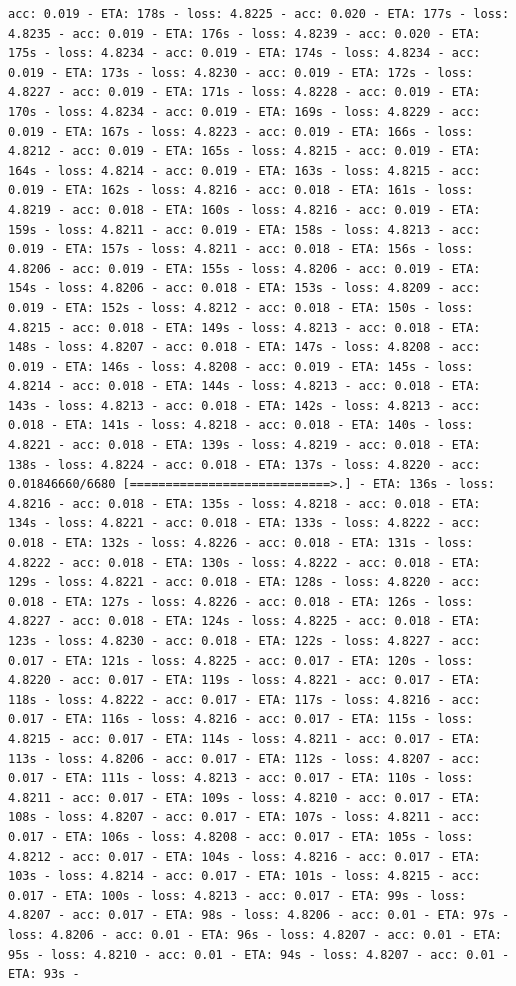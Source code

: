 \documentclass[11pt]{article}
\begin{document}
\begin{Verbatim}[commandchars=\\\{\}]
acc: 0.019 - ETA: 178s - loss: 4.8225 - acc: 0.020 - ETA: 177s - loss: 4.8235 - acc: 0.019 - ETA: 176s - loss: 4.8239 - acc: 0.020 - ETA: 175s - loss: 4.8234 - acc: 0.019 - ETA: 174s - loss: 4.8234 - acc: 0.019 - ETA: 173s - loss: 4.8230 - acc: 0.019 - ETA: 172s - loss: 4.8227 - acc: 0.019 - ETA: 171s - loss: 4.8228 - acc: 0.019 - ETA: 170s - loss: 4.8234 - acc: 0.019 - ETA: 169s - loss: 4.8229 - acc: 0.019 - ETA: 167s - loss: 4.8223 - acc: 0.019 - ETA: 166s - loss: 4.8212 - acc: 0.019 - ETA: 165s - loss: 4.8215 - acc: 0.019 - ETA: 164s - loss: 4.8214 - acc: 0.019 - ETA: 163s - loss: 4.8215 - acc: 0.019 - ETA: 162s - loss: 4.8216 - acc: 0.018 - ETA: 161s - loss: 4.8219 - acc: 0.018 - ETA: 160s - loss: 4.8216 - acc: 0.019 - ETA: 159s - loss: 4.8211 - acc: 0.019 - ETA: 158s - loss: 4.8213 - acc: 0.019 - ETA: 157s - loss: 4.8211 - acc: 0.018 - ETA: 156s - loss: 4.8206 - acc: 0.019 - ETA: 155s - loss: 4.8206 - acc: 0.019 - ETA: 154s - loss: 4.8206 - acc: 0.018 - ETA: 153s - loss: 4.8209 - acc: 0.019 - ETA: 152s - loss: 4.8212 - acc: 0.018 - ETA: 150s - loss: 4.8215 - acc: 0.018 - ETA: 149s - loss: 4.8213 - acc: 0.018 - ETA: 148s - loss: 4.8207 - acc: 0.018 - ETA: 147s - loss: 4.8208 - acc: 0.019 - ETA: 146s - loss: 4.8208 - acc: 0.019 - ETA: 145s - loss: 4.8214 - acc: 0.018 - ETA: 144s - loss: 4.8213 - acc: 0.018 - ETA: 143s - loss: 4.8213 - acc: 0.018 - ETA: 142s - loss: 4.8213 - acc: 0.018 - ETA: 141s - loss: 4.8218 - acc: 0.018 - ETA: 140s - loss: 4.8221 - acc: 0.018 - ETA: 139s - loss: 4.8219 - acc: 0.018 - ETA: 138s - loss: 4.8224 - acc: 0.018 - ETA: 137s - loss: 4.8220 - acc: 0.01846660/6680 [============================>.] - ETA: 136s - loss: 4.8216 - acc: 0.018 - ETA: 135s - loss: 4.8218 - acc: 0.018 - ETA: 134s - loss: 4.8221 - acc: 0.018 - ETA: 133s - loss: 4.8222 - acc: 0.018 - ETA: 132s - loss: 4.8226 - acc: 0.018 - ETA: 131s - loss: 4.8222 - acc: 0.018 - ETA: 130s - loss: 4.8222 - acc: 0.018 - ETA: 129s - loss: 4.8221 - acc: 0.018 - ETA: 128s - loss: 4.8220 - acc: 0.018 - ETA: 127s - loss: 4.8226 - acc: 0.018 - ETA: 126s - loss: 4.8227 - acc: 0.018 - ETA: 124s - loss: 4.8225 - acc: 0.018 - ETA: 123s - loss: 4.8230 - acc: 0.018 - ETA: 122s - loss: 4.8227 - acc: 0.017 - ETA: 121s - loss: 4.8225 - acc: 0.017 - ETA: 120s - loss: 4.8220 - acc: 0.017 - ETA: 119s - loss: 4.8221 - acc: 0.017 - ETA: 118s - loss: 4.8222 - acc: 0.017 - ETA: 117s - loss: 4.8216 - acc: 0.017 - ETA: 116s - loss: 4.8216 - acc: 0.017 - ETA: 115s - loss: 4.8215 - acc: 0.017 - ETA: 114s - loss: 4.8211 - acc: 0.017 - ETA: 113s - loss: 4.8206 - acc: 0.017 - ETA: 112s - loss: 4.8207 - acc: 0.017 - ETA: 111s - loss: 4.8213 - acc: 0.017 - ETA: 110s - loss: 4.8211 - acc: 0.017 - ETA: 109s - loss: 4.8210 - acc: 0.017 - ETA: 108s - loss: 4.8207 - acc: 0.017 - ETA: 107s - loss: 4.8211 - acc: 0.017 - ETA: 106s - loss: 4.8208 - acc: 0.017 - ETA: 105s - loss: 4.8212 - acc: 0.017 - ETA: 104s - loss: 4.8216 - acc: 0.017 - ETA: 103s - loss: 4.8214 - acc: 0.017 - ETA: 101s - loss: 4.8215 - acc: 0.017 - ETA: 100s - loss: 4.8213 - acc: 0.017 - ETA: 99s - loss: 4.8207 - acc: 0.017 - ETA: 98s - loss: 4.8206 - acc: 0.01 - ETA: 97s - loss: 4.8206 - acc: 0.01 - ETA: 96s - loss: 4.8207 - acc: 0.01 - ETA: 95s - loss: 4.8210 - acc: 0.01 - ETA: 94s - loss: 4.8207 - acc: 0.01 - ETA: 93s - 
\end{Verbatim}
\end{document}
